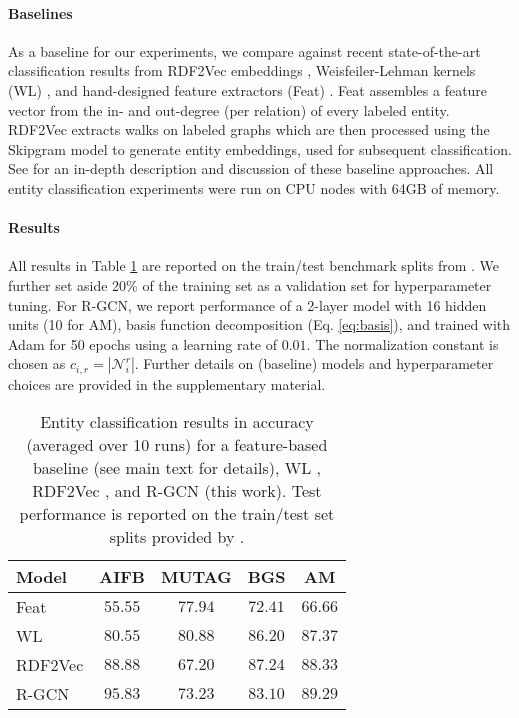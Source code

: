 \paragraph{Baselines}
As a baseline for our experiments, we compare against recent state-of-the-art classification results from RDF2Vec embeddings \cite{ristoski2016rdf2vec}, Weisfeiler-Lehman kernels (WL) \cite{shervashidze2011weisfeiler,de2015substructure}, and hand-designed feature extractors (Feat) \cite{paulheim2012unsupervised}. Feat assembles a feature vector from the in- and out-degree (per relation) of every labeled entity. RDF2Vec extracts walks on labeled graphs which are then processed using the Skipgram \cite{mikolov2013distributed} model to generate entity embeddings, used for subsequent classification. See \citet{ristoski2016rdf2vec} for an in-depth description and discussion of these baseline approaches. All entity classification experiments were run on CPU nodes with 64GB of memory.

\paragraph{Results}
All results in Table \ref{table:classification_results} are reported on the train/test benchmark splits from \citet{ristoski2016collection}. We further set aside 20\% of the training set as a validation set for hyperparameter tuning. For R-GCN, we report performance of a 2-layer model with 16 hidden units (10 for AM), basis function decomposition (Eq. \ref{eq:basis}), and trained with Adam \cite{kingma2014adam} for 50 epochs using a learning rate of $0.01$.  The normalization constant is chosen as $c_{i,r}=|\mathcal{N}_i^r|$. Further details on (baseline) models and hyperparameter choices are provided in the supplementary material.

\begin{table}[htp!]
\centering
\begin{tabular}{lcccc}
\toprule
Model & AIFB & MUTAG & BGS & AM  \\ \midrule
Feat & $55.55$ & $77.94$ & $72.41$ & $66.66$ \\
WL		& $80.55$ & $\mathbf{80.88}$ & $86.20$ & $87.37$  \\
RDF2Vec  & $88.88$ & $67.20$ & $\mathbf{87.24}$ & $88.33$ \\
R-GCN			& $\mathbf{95.83}$ & $73.23$ & $83.10$  & $\mathbf{89.29}$ \\\bottomrule

\end{tabular}
\caption{Entity classification results in accuracy (averaged over 10 runs) for a feature-based baseline (see main text for details), WL \cite{shervashidze2011weisfeiler,de2015substructure}, RDF2Vec \cite{ristoski2016rdf2vec}, and R-GCN (this work). Test performance is reported on the train/test set splits provided by \citet{ristoski2016collection}. \label{table:classification_results}} %
\end{table}

